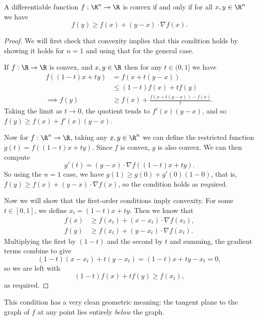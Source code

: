 \documentclass[a4paper]{scrartcl}
\begin{document}
\begin{proposition}
A differentiable function $f: \R^n \rightarrow \R$ is convex if and only if for all $x, y \in \R^n$ we have
$$
f(y) \geq f(x) + (y - x) \cdot \nabla f(x).
$$
\end{proposition}
\begin{proof}
    We will first check that convexity implies that this condition holds by showing it holds for $n = 1$ and using that for the general case.

    If $f: \R \rightarrow \R$ is convex, and $x, y \in \R$ then for any $t \in (0, 1]$ we have
    \begin{align*}
        f((1 - t)x + ty) &= f(x + t(y - x)) \\
        & \leq (1 - t)f(x) + tf(y) \\
\implies f(y) & \geq f(x) + \frac{f(x + t(y - x)) - f(x)}{t}.
    \end{align*}
    Taking the limit as $t \rightarrow 0$, the quotient tends to $f'(x)(y - x)$, and so $f(y) \geq f(x) + f'(x)(y - x)$.

    Now for $f: \R^n \rightarrow \R$, taking any $x, y \in \R^n$ we can define the restricted function $g(t) = f((1 - t)x + ty)$. Since $f$ is convex, $g$ is also convex. We can then compute
    $$
    g'(t) = (y - x) \cdot \nabla f((1 - t) x + ty).
    $$
    So using the $n = 1$ case, we have $g(1) \geq g(0) + g'(0) (1 - 0)$, that is, $f(y) \geq f(x) + (y - x) \cdot \nabla f(x)$, so the condition holds as required.

    Now we will show that the first-order conditions imply convexity.
    For some $t \in [0, 1]$, we define $x_t = (1 - t) x + ty$. Then we know that
    \begin{align*}
        f(x) &\geq f(x_t) + (x - x_t) \cdot \nabla f(x_t), \\
        f(y) &\geq f(x_t) + (y - x_t) \cdot \nabla f(x_t).
    \end{align*}
    Multiplying the first by $(1 - t)$ and the second by $t$ and summing, the gradient terms combine to give
    $$
    (1-t)(x - x_t) + t(y - x_t) = (1-t)x + ty - x_t = 0,
    $$
    so we are left with
    $$
    (1 - t)f(x) + tf(y) \geq f(x_t),
    $$
    as required.
\end{proof}

This condition has a very clean geometric meaning: the tangent plane to the graph of $f$ at any point lies entirely \emph{below} the graph.

\begin{center}
\end{center}
\end{document}
